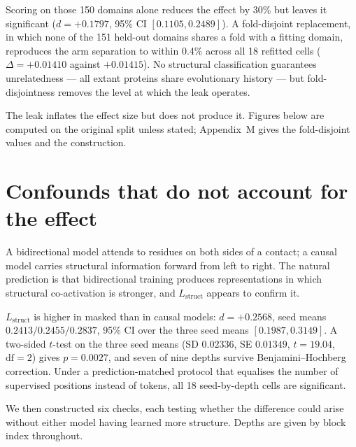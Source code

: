 \documentclass{article} %
\newcommand{\Lstruct}{\ensuremath{L_{\mathrm{struct}}}}
\begin{document}
Scoring on those 150 domains alone reduces the effect by 30\% but leaves it significant ($d =
+0.1797$, 95\% CI $[0.1105, 0.2489]$). A fold-disjoint replacement, in which none of the 151
held-out domains shares a fold with a fitting domain, reproduces the arm separation to within
0.4\% across all 18 refitted cells ($\Delta = +0.01410$ against $+0.01415$). No structural
classification guarantees unrelatedness --- all extant proteins share evolutionary history --- but
fold-disjointness removes the level at which the leak operates.

The leak inflates the effect size but does not produce it. Figures below are computed on the
original split unless stated; Appendix~M gives the fold-disjoint values and the construction.

\section{Confounds that do not account for the effect}
\label{sec:confounds}

A bidirectional model attends to residues on both sides of a contact; a causal model carries
structural information forward from left to right. The natural prediction is that bidirectional
training produces representations in which structural co-activation is stronger, and \Lstruct{}
appears to confirm it.

\Lstruct{} is higher in masked than in causal models: $d = +0.2568$, seed means $0.2413 / 0.2455 /
0.2837$, 95\% CI over the three seed means $[0.1987, 0.3149]$. A two-sided $t$-test on the three
seed means (SD $0.02336$, SE $0.01349$, $t = 19.04$, $\mathrm{df} = 2$) gives $p = 0.0027$, and
seven of nine depths survive Benjamini--Hochberg correction. Under a prediction-matched protocol
that equalises the number of supervised positions instead of tokens, all 18 seed-by-depth cells
are significant.

We then constructed six checks, each testing whether the difference could arise without either
model having learned more structure. Depths are given by block index throughout.
\end{document}
